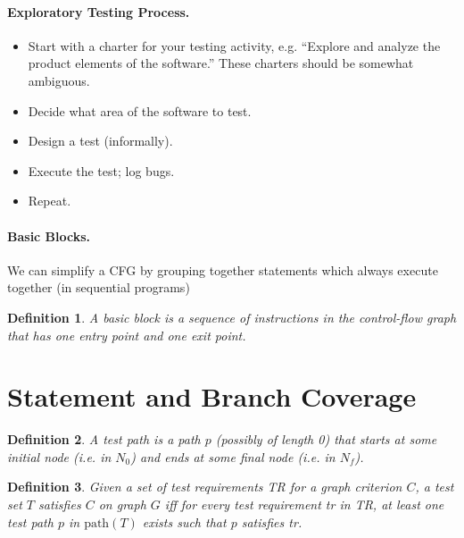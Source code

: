 \documentclass[11pt]{article}
\newtheorem{defn}{Definition}
\begin{document}
\paragraph{Exploratory Testing Process.}

\begin{itemize}[noitemsep]
\item Start with a charter for your testing activity, e.g. ``Explore and analyze the product elements of the software.'' 
These charters should be somewhat ambiguous.
\item Decide what area of the software to test.
\item Design a test (informally).
\item Execute the test; log bugs.
\item Repeat.
\end{itemize}

\newpage

\paragraph{Basic Blocks.} We can simplify a CFG by grouping together
statements which always execute together (in sequential programs)

\begin{defn}
A basic block is a sequence of instructions in the control-flow graph
that has one entry point and one exit point.
\end{defn}

\section*{Statement and Branch Coverage}

\begin{defn} A \emph{test path} is a path $p$ (possibly of length 0)
that starts at some initial node (i.e. in $N_0$) and ends at some final node (i.e. in $N_f$).
\end{defn}

\begin{defn}
Given a set of test requirements \emph{TR} for a graph criterion $C$, 
a test set $T$ satisfies $C$ on graph $G$ iff for every test requirement
\emph{tr} in \emph{TR}, at least one test path $p$ in $\mbox{path}(T)$ 
exists such that $p$ satisfies \emph{tr}.
\end{defn}
\end{document}
